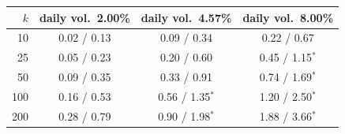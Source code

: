 \begin{tabular}{|r|c|c|c|}
\hline
\rowcolor{gray!15}$k$ & daily vol.\ 2.00\% & daily vol.\ 4.57\% & daily vol.\ 8.00\% \\
\hline
10 & 0.02 / 0.13 & 0.09 / 0.34 & 0.22 / 0.67 \\
\hline
25 & 0.05 / 0.23 & 0.20 / 0.60 & 0.45 / 1.15$^{\ast}$ \\
\hline
50 & 0.09 / 0.35 & 0.33 / 0.91 & 0.74 / 1.69$^{\ast}$ \\
\hline
100 & 0.16 / 0.53 & 0.56 / 1.35$^{\ast}$ & 1.20 / 2.50$^{\ast}$ \\
\hline
200 & 0.28 / 0.79 & 0.90 / 1.98$^{\ast}$ & 1.88 / 3.66$^{\ast}$ \\
\hline
\end{tabular}
